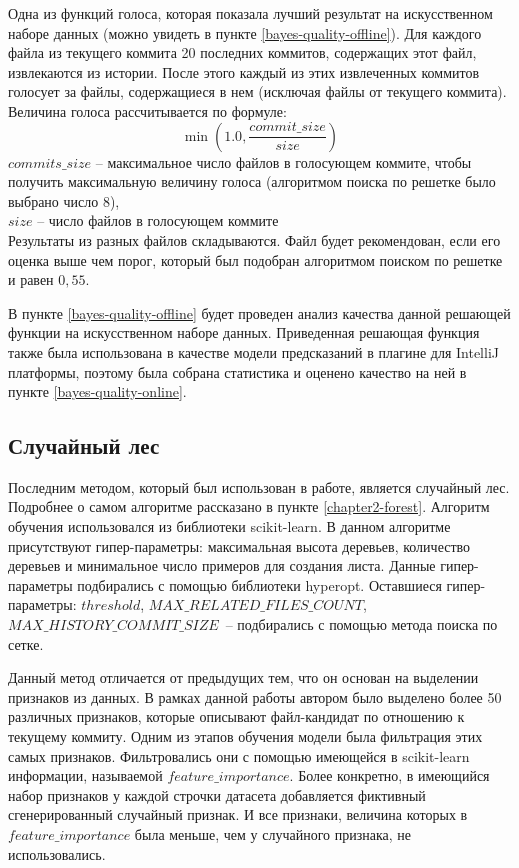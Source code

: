 Одна из функций голоса, которая показала лучший результат на искусственном наборе данных (можно увидеть в пункте \ref{bayes-quality-offline}). Для каждого файла из текущего коммита 20 последних коммитов, содержащих этот файл, извлекаются из истории. После этого каждый из этих извлеченных коммитов голосует за файлы, содержащиеся в нем (исключая файлы от текущего коммита). Величина голоса рассчитывается по формуле: 
    $$\min(1.0, \frac{{commit\_size}}{{size}})$$
$commits\_size$ --  максимальное число файлов в голосующем коммите, чтобы получить максимальную величину голоса (алгоритмом поиска по решетке было выбрано число 8),\\
$size$ -- число файлов в голосующем коммите\\
Результаты из разных файлов складываются. Файл будет рекомендован, если его оценка выше чем порог, который был подобран алгоритмом поиском по решетке и равен $0,55$.

В пункте \ref{bayes-quality-offline} будет проведен анализ качества данной решающей функции на искусственном наборе данных. Приведенная решающая функция также была использована в качестве модели предсказаний в плагине для IntelliJ платформы, поэтому была собрана статистика и оценено качество на ней в пункте \ref{bayes-quality-online}. 
    \subsection{Случайный лес}
Последним методом, который был использован в работе, является случайный лес. Подробнее о самом алгоритме рассказано в пункте \ref{chapter2-forest}. Алгоритм обучения использовался из библиотеки scikit-learn. В данном алгоритме присутствуют гипер-параметры: максимальная высота деревьев, количество деревьев и минимальное число примеров для создания листа. Данные гипер-параметры подбирались с помощью библиотеки hyperopt. Оставшиеся гипер-параметры: $threshold$, $MAX\_RELATED\_FILES\_COUNT$, $MAX\_HISTORY\_COMMIT\_SIZE$~-- подбирались с помощью метода поиска по сетке. 

Данный метод отличается от предыдущих тем, что он основан на выделении признаков из данных. В рамках данной работы автором было выделено более 50 различных признаков, которые описывают файл-кандидат по отношению к текущему коммиту. Одним из этапов обучения модели была фильтрация этих самых признаков. Фильтровались они с помощью имеющейся в scikit-learn информации, называемой $feature\_importance$. Более конкретно, в имеющийся набор признаков у каждой строчки датасета добавляется фиктивный сгенерированный случайный признак. И все признаки, величина которых в $feature\_importance$ была меньше, чем у случайного признака, не использовались.

